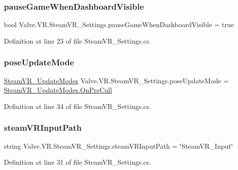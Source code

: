 \subsubsection{\texorpdfstring{pauseGameWhenDashboardVisible}{pauseGameWhenDashboardVisible}}
{\footnotesize\ttfamily bool Valve.\+V\+R.\+Steam\+V\+R\+\_\+\+Settings.\+pause\+Game\+When\+Dashboard\+Visible = true}



Definition at line 23 of file Steam\+V\+R\+\_\+\+Settings.\+cs.

\mbox{\label{class_valve_1_1_v_r_1_1_steam_v_r___settings_a1acd0f56e18ac3796933e2da5b8f3ab0}} 
\subsubsection{\texorpdfstring{poseUpdateMode}{poseUpdateMode}}
{\footnotesize\ttfamily \mbox{\hyperlink{namespace_valve_1_1_v_r_ac8b0fe3bc9754b0fb9f1351ae3444ac6}{Steam\+V\+R\+\_\+\+Update\+Modes}} Valve.\+V\+R.\+Steam\+V\+R\+\_\+\+Settings.\+pose\+Update\+Mode = \mbox{\hyperlink{namespace_valve_1_1_v_r_ac8b0fe3bc9754b0fb9f1351ae3444ac6a0384dab65f333cc4dd5858f28513ee82}{Steam\+V\+R\+\_\+\+Update\+Modes.\+On\+Pre\+Cull}}}



Definition at line 34 of file Steam\+V\+R\+\_\+\+Settings.\+cs.

\mbox{\label{class_valve_1_1_v_r_1_1_steam_v_r___settings_af9de2fa06a57c1d393d55e654e2b77a4}} 
\subsubsection{\texorpdfstring{steamVRInputPath}{steamVRInputPath}}
{\footnotesize\ttfamily string Valve.\+V\+R.\+Steam\+V\+R\+\_\+\+Settings.\+steam\+V\+R\+Input\+Path = \char`\"{}Steam\+V\+R\+\_\+\+Input\char`\"{}}



Definition at line 31 of file Steam\+V\+R\+\_\+\+Settings.\+cs.

